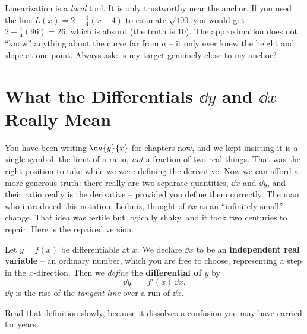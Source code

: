 \begin{trapbox}
Linearization is a \emph{local} tool. It is only trustworthy near the anchor. If
you used the line $L(x)=2+\tfrac14(x-4)$ to estimate $\sqrt{100}$ you would get
$2+\tfrac14(96)=26$, which is absurd (the truth is $10$). The approximation does
not ``know'' anything about the curve far from $a$ -- it only ever knew the height
and slope at one point. Always ask: is my target genuinely close to my anchor?
\end{trapbox}

\section{What the Differentials \texorpdfstring{$\dd y$}{dy} and \texorpdfstring{$\dd x$}{dx} Really Mean}
\label{ch14:differentials}

You have been writing $\dv{y}{x}$ for chapters now, and we kept insisting it is a
single symbol, the limit of a ratio, \emph{not} a fraction of two real things.
That was the right position to take while we were defining the derivative. Now we
can afford a more generous truth: there really are two separate quantities, $\dd x$
and $\dd y$, and their ratio really is the derivative -- provided you define them
correctly. The man who introduced this notation, Leibniz, thought of $\dd x$ as
an ``infinitely small'' change. That idea was fertile but logically shaky, and it
took two centuries to repair. Here is the repaired version.

\begin{definition}
\label{ch14:def-differentials}
Let $y=f(x)$ be differentiable at $x$. We declare $\dd x$ to be an
\textbf{independent real variable} -- an ordinary number, which you are free to
choose, representing a step in the $x$-direction. Then we \emph{define} the
\textbf{differential of $y$} by
\[
\dd y \;=\; f'(x)\,\dd x.
\]
$\dd y$ is the rise of the \emph{tangent line} over a run of $\dd x$.
\end{definition}

Read that definition slowly, because it dissolves a confusion you may have
carried for years.

